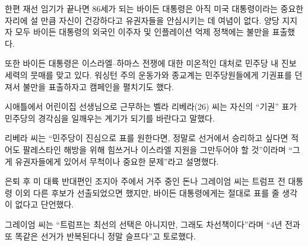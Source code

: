 \documentclass{translation}
\begin{document}
한편 재선 임기가 끝나면 86세가 되는 바이든 대통령은 아직 미국 대통령이라는 중요한 자리에 설 만큼 자신이 건강하다고 유권자들을 안심시키는 데 여념이 없다.
양당 지지자 모두 바이든 대통령의 외국인 이주자 및 인플레이션 억제 정책에는 불만을 표출했다.

또한 바이든 대통령은 이스라엘--하마스 전쟁에 대한 미온적인 대처로 민주당 내 진보 세력의 뭇매를 맞고 있다.
워싱턴 주의 운동가와 종교계는 민주당원들에게 기권표를 던져서 불만을 표출하자고 캠페인을 펼치기도 했다.

시애틀에서 어린이집 선생님으로 근무하는 벨라 리베라(26) 씨는 자신의 ``기권'' 표가 민주당의 경각심을 일깨우는 계기가 되기를 바란다고 말했다.

리베라 씨는 ``민주당이 진심으로 표를 원한다면, 정말로 선거에서 승리하고 싶다면 적어도 팔레스타인 해방을 위해 힘쓰거나 이스라엘 지원을 그만두어야 할 것''이라며 ``그게 유권자들에게 있어서 무척이나 중요한 문제''라고 설명했다.

은퇴 후 미 대륙 반대편인 조지아 주에서 거주 중인 돈나 그레이엄 씨는 트럼프 전 대통령 이외 다른 후보가 선출되었으면 했지만, 바이든 대통령에게는 절대로 표를 줄 생각이 없다고 단언했다.

그레이엄 씨는 ``트럼프는 최선의 선택은 아니지만, 그래도 차선책이다''라며 ``4년 전과 또 똑같은 선거가 반복된다니 정말 슬프다''고 토로했다.
\end{document}
